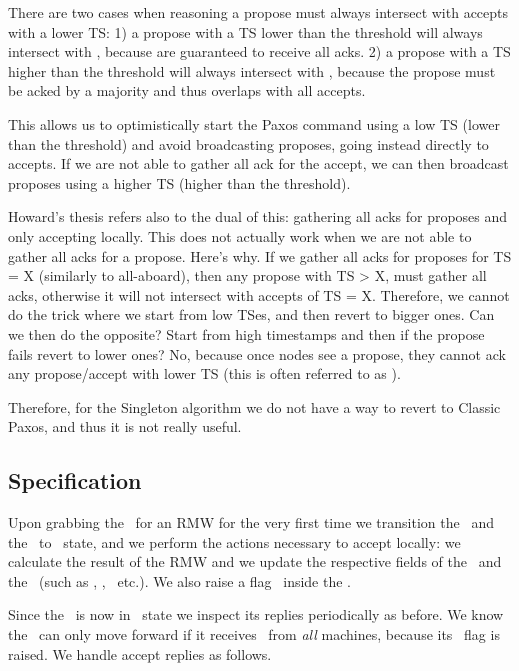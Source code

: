 There are two cases when reasoning a propose must always intersect with accepts with a lower TS: 1) a propose with a TS lower than the threshold will always intersect with , because  are guaranteed to receive all acks.
2) a propose with a TS higher than the threshold will always intersect with , because the propose must be acked by a majority and thus overlaps with all accepts.

This allows us to optimistically start the Paxos command using a low TS (lower than the threshold) and avoid broadcasting proposes, going instead directly to accepts. If we are not able to gather all ack for the accept, we can then broadcast proposes using a higher TS (higher than the threshold).


\custvspace
{}
Howard's thesis refers also to the dual of this: gathering all acks for proposes and only accepting locally.
This does not actually work when we are not able to gather all acks for a propose. 
Here's why.
If we gather all acks for proposes for TS = X (similarly to all-aboard), then any propose with TS > X, must gather all acks, otherwise it will not intersect with accepts of TS = X.
Therefore, we cannot do the trick where we start from low TSes, and then revert to bigger ones.
Can we then do the opposite? Start from high timestamps and then if the propose fails revert to lower ones? No, because once nodes see a propose, they cannot ack any propose/accept with lower TS (this is often referred to as ).

Therefore, for the Singleton algorithm we do not have a way to revert to Classic Paxos, and thus it is not really useful. %


\subsection{Specification}
Upon grabbing the \kv~for an RMW for the very first time we transition the \kv~and the \locentry~to \acced~state, and we perform the actions necessary to accept locally: we calculate the result of the RMW and we update the respective fields of the \kv~and the \locentry~(such as \accval, \accts, \rmw~etc.). We also raise a flag \allab~inside the \locentry. 

Since the \locentry~is now in \acced~state we inspect its replies periodically as before.
We know the \locentry~can only move forward if it receives \acks~from \emph{all} machines, because its \allab~flag is raised. 
We handle accept replies as follows.


